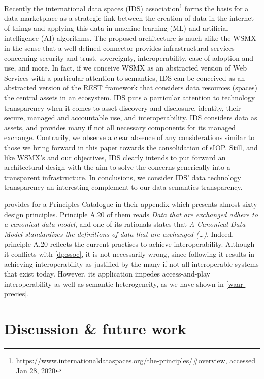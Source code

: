 \documentclass[sort&compress,preprint,authoryear,3p,twocolumn]{elsarticle}
\begin{document}
Recently the international data spaces (IDS) association\footnote{https://www.internationaldataspaces.org/the-principles/\#overview,
  accessed Jan 28, 2020} forms the basis for a data marketplace as a
strategic link between the creation of data in the internet of things
and applying this data in machine learning (ML) and artificial
intelligence (AI) algorithms. The proposed architecture is much alike
the WSMX in the sense that a well-defined connector provides
infrastructural services concerning security and trust, sovereignty,
interoperability, ease of adoption and use, and more. In fact, if we
conceive WSMX as an abstracted version of Web Services with a particular
attention to semantics, IDS can be conceived as an abstracted version of
the REST framework that considers data resources (spaces) the central
assets in an ecosystem. IDS puts a particular attention to technology
transparency when it comes to asset discovery and disclosure, identity,
their secure, managed and accountable use, and interoperability. IDS
considers data as assets, and provides many if not all necessary
components for its managed exchange. Contrarily, we observe a clear
absence of any considerations similar to those we bring forward in this
paper towards the consolidation of sIOP. Still, and like WSMX's and our
objectives, IDS clearly intends to put forward an architectural design
with the aim to solve the concerns generically into a transparent
infrastructure. In conclusions, we consider IDS' data technology
transparency an interesting complement to our data semantics
transparency.

\citep{Greefhorst2011} provides for a Principles Catalogue in their
appendix which presents almost sixty design principles. Principle A.20
of them reads \emph{Data that are exchanged adhere to a canonical data
model}, and one of its rationals states that \emph{A Canonical Data
Model standardizes the definitions of data that are exchanged (\ldots)}.
Indeed, principle A.20 reflects the current practises to achieve
interoperability. Although it conflicts with \cref{dp:ssoc}, it is not
necessarily wrong, since following it results in achieving
interoperability as justified by the many if not all interoperable
systems that exist today. However, its application impedes
access-and-play interoperability as well as semantic heterogeneity, as
we have shown in \cref{waar-precies}.

\hypertarget{discussion-future-work}{%
\section{Discussion \& future work}\label{discussion-future-work}}
\end{document}
